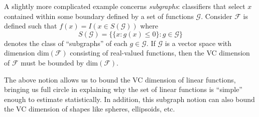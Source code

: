 \documentclass[
]{article}
\begin{document}
A slightly more complicated example concerns \emph{subgraphs}:
classifiers that select \(x\) contained within some boundary defined by
a set of functions \(\mathscr{G}\). Consider \(\mathscr{F}\) is defined
such that \(f(x) = I(x \in S(\mathscr{G}))\) where
\[S(\mathscr{G}) = \Big\{\{x: g(x) \leq 0\} : g \in \mathcal{G}\Big\}\]
denotes the class of ``subgraphs'' of each \(g \in \mathscr{G}\). If
\(\mathscr{G}\) is a vector space with dimension
\(\text{dim}(\mathcal{F})\) consisting of real-valued functions, then
the VC dimension of \(\mathscr{F}\) must be bounded by
\(\text{dim}(\mathcal{F})\).

The above notion allows us to bound the VC dimension of linear
functions, bringing us full circle in explaining why the set of linear
functions is ``simple'' enough to estimate statistically. In addition,
this subgraph notion can also bound the VC dimension of shapes like
spheres, ellipsoids, etc.
\end{document}
